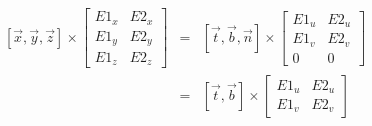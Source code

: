 \documentclass[12pt]{article}
\begin{document}
    \begin{eqnarray*}
        \left[ \overrightarrow{x}, \overrightarrow{y}, \overrightarrow{z} \right]       
        \times
        \left[ \begin{array}{cc}
            E1_x & E2_x \\
            E1_y & E2_y \\
            E1_z & E2_z
        \end{array} \right]
        & = &
        \left[ \overrightarrow{t}, \overrightarrow{b}, \overrightarrow{n} \right]       
        \times
        \left[ \begin{array}{cc}
            E1_u & E2_u \\
            E1_v & E2_v \\
            0    & 0
        \end{array} \right] \\
        & = &
        \left[ \overrightarrow{t}, \overrightarrow{b} \right]       
        \times
        \left[ \begin{array}{cc}
            E1_u & E2_u \\
            E1_v & E2_v
        \end{array} \right]
    \end{eqnarray*}
\end{document}
